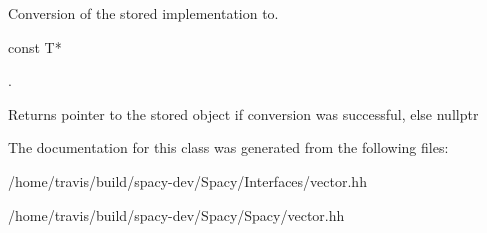\-Conversion of the stored implementation to. 


\begin{DoxyCode}
 const T* 
\end{DoxyCode}
. \begin{DoxyReturn}{\-Returns}
pointer to the stored object if conversion was successful, else nullptr 
\end{DoxyReturn}


\-The documentation for this class was generated from the following files\-:\begin{DoxyCompactItemize}
\item 
/home/travis/build/spacy-\/dev/\-Spacy/\-Interfaces/vector.\-hh\item 
/home/travis/build/spacy-\/dev/\-Spacy/\-Spacy/vector.\-hh\end{DoxyCompactItemize}
